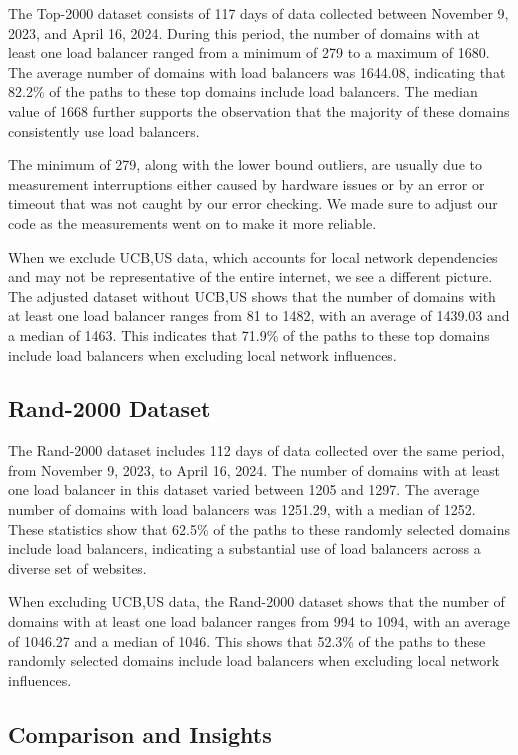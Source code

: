 \documentclass[12pt]{cwru_thesis}
\begin{document}
The Top-2000 dataset consists of 117 days of data collected between November 9, 2023, and April 16, 2024. During this period, the number of domains with at least one load balancer ranged from a minimum of 279 to a maximum of 1680. The average number of domains with load balancers was 1644.08, indicating that 82.2\% of the paths to these top domains include load balancers. The median value of 1668 further supports the observation that the majority of these domains consistently use load balancers.

The minimum of 279, along with the lower bound outliers, are usually due to measurement interruptions either caused by hardware issues or by an error or timeout that was not caught by our error checking. We made sure to adjust our code as the measurements went on to make it more reliable.

When we exclude UCB,US data, which accounts for local network dependencies and may not be representative of the entire internet, we see a different picture. The adjusted dataset without UCB,US shows that the number of domains with at least one load balancer ranges from 81 to 1482, with an average of 1439.03 and a median of 1463. This indicates that 71.9\% of the paths to these top domains include load balancers when excluding local network influences.

\subsection{Rand-2000 Dataset}

The Rand-2000 dataset includes 112 days of data collected over the same period, from November 9, 2023, to April 16, 2024. The number of domains with at least one load balancer in this dataset varied between 1205 and 1297. The average number of domains with load balancers was 1251.29, with a median of 1252. These statistics show that 62.5\% of the paths to these randomly selected domains include load balancers, indicating a substantial use of load balancers across a diverse set of websites.

When excluding UCB,US data, the Rand-2000 dataset shows that the number of domains with at least one load balancer ranges from 994 to 1094, with an average of 1046.27 and a median of 1046. This shows that 52.3\% of the paths to these randomly selected domains include load balancers when excluding local network influences.

\subsection{Comparison and Insights}
\end{document}
